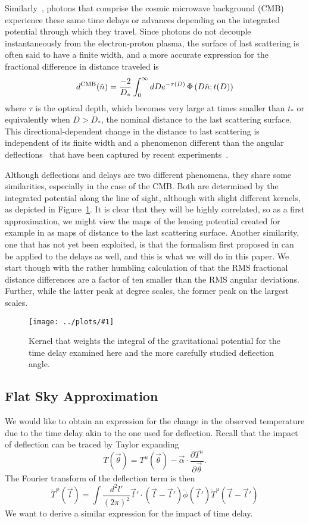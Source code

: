 \documentclass[prl,amsmath,amssymb,floatfix,superscriptaddress,nofootinbib,twocolumn]{revtex4-1}
\def\be{\begin{equation}}
\def\ee{\end{equation}}
\newcommand{\eql}[1]{\label{eq:#1}}
\newcommand{\sfig}[2]{
\texttt{[image: ../plots/\#1]}
        }
\newcommand{\Sfig}[2]{
   \begin{figure}[thbp]
   \begin{center}
    \sfig{#1.pdf}{0.9\columnwidth}
    \caption{{\small #2}}
    \label{fig:#1}
     \end{center}
   \end{figure}
}
\newcommand{\rf}[1]{\ref{fig:#1}}
\begin{document}
Similarly~\cite{Hu:2001yq}, photons that comprise the cosmic microwave background (CMB) experience these same time delays or advances depending on the integrated potential through which they travel. Since photons do not decouple instantaneously from the electron-proton plasma, the surface of last scattering is often said to have a finite width, and a more accurate expression for the fractional difference in distance traveled is
\be
d^{\rm CMB}(\hat n) = \frac{-2}{D_*} \int_0^\infty dD e^{-\tau(D)}\, \Phi\left(D\hat n; t(D)\right)
\ee
where $\tau$ is the optical depth, which becomes very large at times smaller than $t_*$ or equivalently when $D>D_*$, the nominal distance to the last scattering surface. This directional-dependent change in the distance to last scattering is independent of its finite width and a phenomenon different than the angular deflections~\cite{Hu:2001tn,Lewis:2006fu} that have been captured by recent experiments~\cite{Smith:2007rg,Ade:2013tyw,Story:2014hni,Sherwin:2016tyf,Aghanim:2018oex}.

Although deflections and delays are two different phenomena, they share some similarities, especially in the case of the CMB. Both are determined by the integrated potential along the line of sight, although with slight different kernels, as depicted in Figure~\rf{kernel}. It is clear that they will be highly correlated, so as a first approximation, we might view the maps of the lensing potential created for example in \citet{Aghanim:2018oex} as maps of distance to the last scattering surface. Another similarity, one that has not yet been exploited, is that the formalism first proposed in \citet{Hu:2001tn} can be applied to the delays as well, and this is what we will do in this paper. We start though with the rather humbling calculation of \cite{Hu:2001yq} that the RMS fractional distance differences are a factor of ten smaller than the RMS angular deviations. Further, while the latter peak at degree scales, the former peak on the largest scales.

\Sfig{kernel}{Kernel that weights the integral of the gravitational potential for the time delay examined here and the more carefully studied deflection angle.}

\subsection{Flat Sky Approximation} We would like to obtain an expression for the change in the observed temperature due to the time delay akin to the one used for deflection. Recall that the impact of deflection can be traced by Taylor expanding
\begin{equation}
T(\vec\theta) = T^u(\vec\theta) - \vec\alpha\cdot \frac{\partial T^u}{\partial\vec\theta}.
\end{equation}
The Fourier transform of the deflection term is then
\begin{equation}
\tilde T^\phi(\vec l) =\int \frac{d^2l'}{(2\pi)^2} \vec l'\cdot (\vec l-\vec l') \tilde\phi(\vec l') \tilde T^u(\vec l-\vec l')
\eql{tphi}\end{equation}
We want to derive a similar expression for the impact of time delay. 
\end{document}
